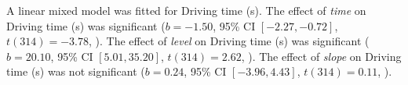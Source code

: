 A linear mixed model was fitted for Driving time (s).
The effect of \textit{time} on Driving time (s) was significant ($b = -1.50$, 95\% CI $[-2.27, -0.72]$, $t(314) = -3.78$, ).
The effect of \textit{level} on Driving time (s) was significant ($b = 20.10$, 95\% CI $[5.01, 35.20]$, $t(314) = 2.62$, ).
The effect of \textit{slope} on Driving time (s) was not significant ($b = 0.24$, 95\% CI $[-3.96, 4.43]$, $t(314) = 0.11$, ).

